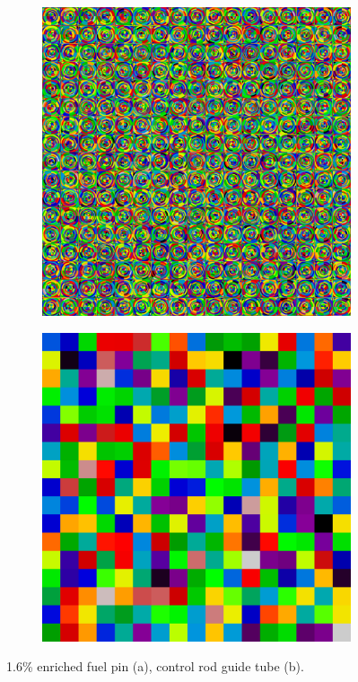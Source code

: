 \begin{figure}[h!]
\centering
\begin{subfigure}{\textwidth}
  \centering
  \includegraphics[width=0.7\linewidth]{figures/quantification/fsrs-assm-16}
  \caption{}
  \label{fig:chap8-assm-1.6}
\end{subfigure}
\begin{subfigure}{\textwidth}
  \centering
  \includegraphics[width=0.7\linewidth]{figures/quantification/cmfd-cells-assm}
  \caption{}
  \label{fig:chap8-cmfd-cells}
\end{subfigure}
\caption[BEAVRS fuel assembly FSR discretization and CMFD cells]{1.6\% enriched fuel pin (a), control rod guide tube (b).}
\label{fig:chap8-assm-fsrs-cmfd-cells}
\end{figure}


